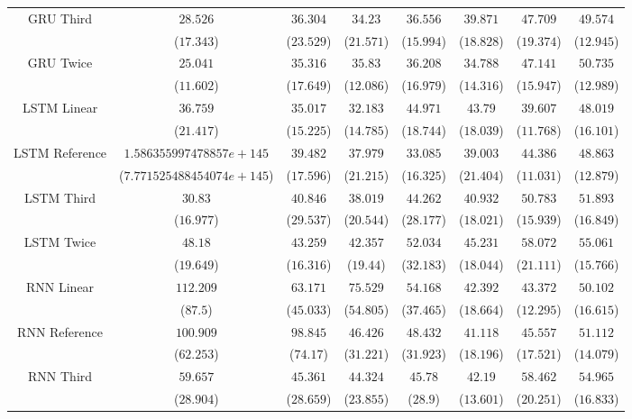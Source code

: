 \begin{table}[!ht]
{\begin{tabular}{|c|c|c|c|c|c|c|c|}
			\multirow{2}{*}{GRU Third} & $28.526$ & $36.304$ & $34.23$ & $36.556$ & $39.871$ & $47.709$ & $49.574$ \\
			 & ($17.343$) & ($23.529$) & ($21.571$) & ($15.994$) & ($18.828$) & ($19.374$) & ($12.945$) \\ \hline
			\multirow{2}{*}{GRU Twice} & $25.041$ & $35.316$ & $35.83$ & $36.208$ & $34.788$ & $47.141$ & $50.735$ \\
			 & ($11.602$) & ($17.649$) & ($12.086$) & ($16.979$) & ($14.316$) & ($15.947$) & ($12.989$) \\ \hline
			\multirow{2}{*}{LSTM Linear} & $36.759$ & $35.017$ & $32.183$ & $44.971$ & $43.79$ & $39.607$ & $48.019$ \\
			 & ($21.417$) & ($15.225$) & ($14.785$) & ($18.744$) & ($18.039$) & ($11.768$) & ($16.101$) \\ \hline
			\multirow{2}{*}{LSTM Reference} & $1.586355997478857e+145$ & $39.482$ & $37.979$ & $33.085$ & $39.003$ & $44.386$ & $48.863$ \\
			 & ($7.771525488454074e+145$) & ($17.596$) & ($21.215$) & ($16.325$) & ($21.404$) & ($11.031$) & ($12.879$) \\ \hline
			\multirow{2}{*}{LSTM Third} & $30.83$ & $40.846$ & $38.019$ & $44.262$ & $40.932$ & $50.783$ & $51.893$ \\
			 & ($16.977$) & ($29.537$) & ($20.544$) & ($28.177$) & ($18.021$) & ($15.939$) & ($16.849$) \\ \hline
			\multirow{2}{*}{LSTM Twice} & $48.18$ & $43.259$ & $42.357$ & $52.034$ & $45.231$ & $58.072$ & $55.061$ \\
			 & ($19.649$) & ($16.316$) & ($19.44$) & ($32.183$) & ($18.044$) & ($21.111$) & ($15.766$) \\ \hline
			\multirow{2}{*}{RNN Linear} & $112.209$ & $63.171$ & $75.529$ & $54.168$ & $42.392$ & $43.372$ & $50.102$ \\
			 & ($87.5$) & ($45.033$) & ($54.805$) & ($37.465$) & ($18.664$) & ($12.295$) & ($16.615$) \\ \hline
			\multirow{2}{*}{RNN Reference} & $100.909$ & $98.845$ & $46.426$ & $48.432$ & $41.118$ & $45.557$ & $51.112$ \\
			 & ($62.253$) & ($74.17$) & ($31.221$) & ($31.923$) & ($18.196$) & ($17.521$) & ($14.079$) \\ \hline
			\multirow{2}{*}{RNN Third} & $59.657$ & $45.361$ & $44.324$ & $45.78$ & $42.19$ & $58.462$ & $54.965$ \\
			 & ($28.904$) & ($28.659$) & ($23.855$) & ($28.9$) & ($13.601$) & ($20.251$) & ($16.833$) \\ \hline

\end{tabular}}
\end{table}
